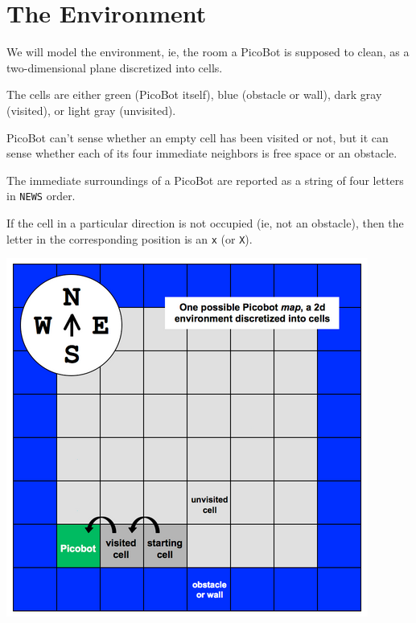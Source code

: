 \documentclass[8pt,a4paper,compress,handout]{beamer}
\begin{document}
\section{The Environment}
\begin{frame}[fragile]
\begin{minipage}{200pt}
We will model the environment, ie, the room a PicoBot is supposed to clean, as a two-dimensional plane discretized into cells.

\bigskip

The cells are either green (PicoBot itself), blue (obstacle or wall), dark gray (visited), or light gray (unvisited). 

\bigskip

PicoBot can't sense whether an empty cell has been visited or not, but it can sense whether each of its four immediate neighbors is free space or an obstacle.

\bigskip

The immediate surroundings of a PicoBot are reported as a string of four letters in \lstinline{NEWS} order.

\bigskip

If the cell in a particular direction is not occupied (ie, not an obstacle), then the letter in the corresponding position is an \lstinline{x} (or \lstinline{X}). 
\end{minipage}\hfill%
\begin{minipage}{100pt}
\begin{center}
\includegraphics[scale=0.25]{figures/picobot_env.png}


\end{center}
\end{minipage}
\end{frame}
\end{document}
